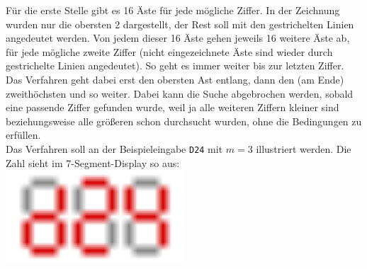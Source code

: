 \documentclass[a4paper,10pt,ngerman]{scrartcl}
\begin{document}
Für die erste Stelle gibt es 16 Äste für jede mögliche Ziffer. In der Zeichnung wurden nur die obersten 2 dargestellt, der Rest soll mit den gestrichelten Linien angedeutet werden. Von jedem dieser 16 Äste gehen jeweils 16 weitere Äste ab, für jede mögliche zweite Ziffer (nicht eingezeichnete Äste sind wieder durch gestrichelte Linien angedeutet). So geht es immer weiter bis zur letzten Ziffer. Das Verfahren geht dabei erst den obersten Ast entlang, dann den (am Ende) zweithöchsten und so weiter. Dabei kann die Suche abgebrochen werden, sobald eine passende Ziffer gefunden wurde, weil ja alle weiteren Ziffern kleiner sind beziehungsweise alle größeren schon durchsucht wurden, ohne die Bedingungen zu erfüllen. \\
Das Verfahren soll an der Beispieleingabe \lstinline|D24| mit $m=3$ illustriert werden. Die Zahl sieht im 7-Segment-Display so aus: \\
\includegraphics[width=0.5\textwidth]{bild1}\\
\end{document}
